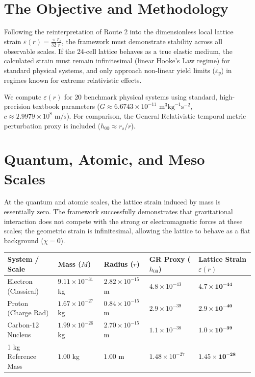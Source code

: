 \documentclass[11pt, letterpaper, openany]{book}
\begin{document}
\section{The Objective and Methodology}

Following the reinterpretation of Route 2 into the dimensionless local lattice strain $\varepsilon(r) = \frac{\pi}{32}\frac{r_s}{r}$, the framework must demonstrate stability across all observable scales. If the 24-cell lattice behaves as a true elastic medium, the calculated strain must remain infinitesimal (linear Hooke's Law regime) for standard physical systems, and only approach non-linear yield limits ($\varepsilon_y$) in regimes known for extreme relativistic effects.

We compute $\varepsilon(r)$ for 20 benchmark physical systems using standard, high-precision textbook parameters ($G \approx 6.6743 \times 10^{-11} \text{ m}^3 \text{kg}^{-1} \text{s}^{-2}$, $c \approx 2.9979 \times 10^8 \text{ m/s}$). For comparison, the General Relativistic temporal metric perturbation proxy is included ($h_{00} \approx r_s/r$).

\section{Quantum, Atomic, and Meso Scales}

At the quantum and atomic scales, the lattice strain induced by mass is essentially zero. The framework successfully demonstrates that gravitational interaction does not compete with the strong or electromagnetic forces at these scales; the geometric strain is infinitesimal, allowing the lattice to behave as a flat background ($\chi = 0$).

\begin{center}
\renewcommand{\arraystretch}{1.2}
\small
\begin{tabular}{|p{3.5cm}|p{2cm}|p{2.5cm}|p{2.2cm}|p{2.5cm}|}
\hline
\rowcolor{kishblue!12}
\textbf{System / Scale} & \textbf{Mass ($M$)} & \textbf{Radius ($r$)} & \textbf{GR Proxy ($h_{00}$)} & \textbf{Lattice Strain $\varepsilon(r)$} \\
\hline
Electron (Classical) & $9.11 \times 10^{-31}$ kg & $2.82 \times 10^{-15}$ m & $4.8 \times 10^{-43}$ & $\mathbf{4.7 \times 10^{-44}}$ \\
\hline
Proton (Charge Rad) & $1.67 \times 10^{-27}$ kg & $0.84 \times 10^{-15}$ m & $2.9 \times 10^{-39}$ & $\mathbf{2.9 \times 10^{-40}}$ \\
\hline
Carbon-12 Nucleus & $1.99 \times 10^{-26}$ kg & $2.70 \times 10^{-15}$ m & $1.1 \times 10^{-38}$ & $\mathbf{1.0 \times 10^{-39}}$ \\
\hline
1 kg Reference Mass & $1.00$ kg & $1.00$ m & $1.48 \times 10^{-27}$ & $\mathbf{1.45 \times 10^{-28}}$ \\
\hline
\end{tabular}
\end{center}
\end{document}
